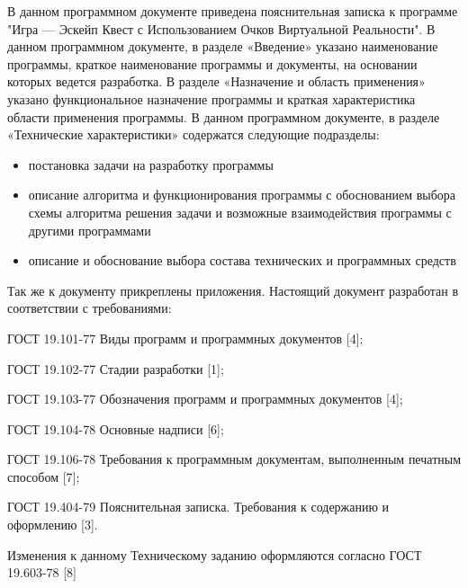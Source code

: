 

В данном программном документе приведена пояснительная записка к программе 
"Игра — Эскейп Квест с Использованием Очков Виртуальной Реальности".
В данном программном документе, в разделе «Введение» указано наименование 
программы, краткое наименование программы и документы, на основании которых 
ведется разработка.
В разделе «Назначение и область применения» указано функциональное назначение 
программы и краткая характеристика области применения программы.
В данном программном документе, в разделе «Технические характеристики» 
содержатся следующие подразделы:
\begin{itemize}
    \item постановка задачи на разработку программы
    \item описание алгоритма и функционирования программы с обоснованием выбора 
    схемы алгоритма решения задачи и возможные взаимодействия программы с 
    другими программами
    \item описание и обоснование выбора состава технических и программных 
    средств
\end{itemize}
Так же к документу прикреплены приложения. 
Настоящий документ разработан в соответствии с требованиями:
\begin{my_enumerate}
    \item ГОСТ 19.101-77 Виды программ и программных документов [4];
    \item ГОСТ 19.102-77 Стадии разработки [1];
    \item ГОСТ 19.103-77 Обозначения программ и программных документов [4];
    \item ГОСТ 19.104-78 Основные надписи [6];
    \item ГОСТ 19.106-78 Требования к программным документам, выполненным 
    печатным 
    способом [7];
    \item ГОСТ 19.404-79 Пояснительная записка. Требования к содержанию и 
    оформлению [3].
\end{my_enumerate}
    Изменения к данному Техническому заданию оформляются согласно ГОСТ 
19.603-78 [8]